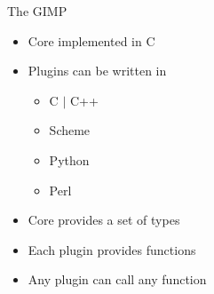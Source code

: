 \documentclass[20pt]{beamer}
\begin{document}
{
  \begin{frame}[plain]
  \end{frame}
}

\begin{frame}{The GIMP}
  \begin{itemize}
  \item Core implemented in C
  \item Plugins can be written in
    \begin{itemize}
    \item C $|$ C++
    \item Scheme
    \item Python
    \item Perl
    \end{itemize}
  \item Core provides a set of types
  \item Each plugin provides functions
  \item Any plugin can call any function
  \end{itemize}
\end{frame}
\end{document}
